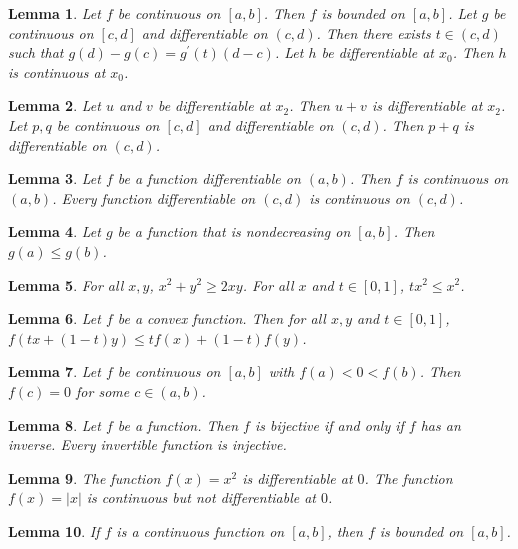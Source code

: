 \documentclass{article}
\newtheorem{lemma}{Lemma}
\begin{document}
\begin{lemma}\label{words-without-noun}
Let $f$ be continuous on $[a,b]$. Then $f$ is bounded on $[a,b]$. Let $g$ be continuous on $[c,d]$ and differentiable on $(c,d)$. Then there exists $t\in(c,d)$ such that $g(d)-g(c)=g^\prime(t)(d-c)$. Let $h$ be differentiable at $x_0$. Then $h$ is continuous at $x_0$.
\end{lemma}

\begin{lemma}\label{several-without-noun}
Let $u$ and $v$ be differentiable at $x_2$. Then $u+v$ is differentiable at $x_2$. Let $p,q$ be continuous on $[c,d]$ and differentiable on $(c,d)$. Then $p+q$ is differentiable on $(c,d)$.
\end{lemma}

\begin{lemma}\label{words-after-the-noun}
Let $f$ be a function differentiable on $(a,b)$. Then $f$ is continuous on $(a,b)$. Every function differentiable on $(c,d)$ is continuous on $(c,d)$.
\end{lemma}

\begin{lemma}\label{nondecreasing-on}
Let $g$ be a function that is nondecreasing on $[a,b]$. Then $g(a)\le g(b)$.
\end{lemma}

\begin{lemma}\label{letters-before-formula}
For all $x,y$, $x^2+y^2\ge 2xy$. For all $x$ and $t\in[0,1]$, $tx^2\le x^2$.
\end{lemma}

\begin{lemma}\label{convexity-inequality}
Let $f$ be a convex function. Then for all $x,y$ and $t\in[0,1]$, $f(tx+(1-t)y)\le tf(x)+(1-t)f(y)$.
\end{lemma}

\begin{lemma}\label{intermediate-value-for-some}
Let $f$ be continuous on $[a,b]$ with $f(a)<0<f(b)$. Then $f(c)=0$ for some $c\in(a,b)$.
\end{lemma}

\begin{lemma}\label{inverse-functions}
Let $f$ be a function. Then $f$ is bijective if and only if $f$ has an inverse. Every invertible function is injective.
\end{lemma}

\begin{lemma}\label{functions-by-formulas}
The function $f(x)=x^2$ is differentiable at $0$. The function $f(x)=|x|$ is continuous but not differentiable at $0$.
\end{lemma}

\begin{lemma}\label{if-on-an-interval}
If $f$ is a continuous function on $[a,b]$, then $f$ is bounded on $[a,b]$.
\end{lemma}
\end{document}
